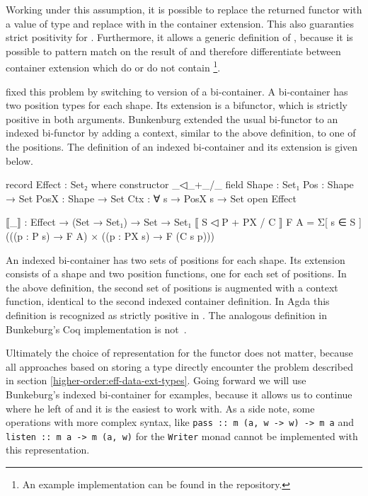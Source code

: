 Working under this assumption, it is possible to replace the returned functor
with a value of type \AgdaSpace{} and
replace  with  in the
container extension.
This also guaranties strict positivity for .
Furthermore, it allows a generic definition of \AgdaFunction{>>=}, because it is
possible to pattern match on the result of  and therefore
differentiate between container extension which do or do not contain
\footnote{An example implementation can be found in the
  repository.}.
 
\textcite{bunkenburg2019modeling} fixed this problem by switching to version of
a bi-container.
A bi-container has two position types for each shape.
Its extension is a bifunctor, which is strictly positive in both arguments.
Bunkenburg extended the usual bi-functor to an indexed bi-functor by adding a
context, similar to the above definition, to one of the positions.
The definition of an indexed bi-container and its extension is given below.

\begin{code}
record Effect : Set₂ where
  constructor _◁_+_/_
  field
    Shape : Set₁
    Pos : Shape → Set
    PosX : Shape → Set
    Ctx : ∀ s → PosX s → Set
open Effect

⟦_⟧ : Effect → (Set → Set₁) → Set → Set₁
⟦ S ◁ P + PX / C ⟧ F A = Σ[ s ∈ S ] (((p : P s) → F A) × ((p : PX s) → F (C s p)))
\end{code}
An indexed bi-container has two sets of positions for each shape.
Its extension consists of a shape and two position functions, one for each set
of positions.
In the above definition, the second set of positions is augmented with a context
function, identical to the second indexed container definition.
In Agda this definition is recognized as strictly positive in .
The analogous definition in Bunkeburg's Coq
implementation is not~\cite{bunkenburg2019modeling}.
 
Ultimately the choice of representation for the functor does not matter, because
all approaches based on storing a type directly encounter the problem described
in section \ref{higher-order:eff-data-ext-types}.
Going forward we will use Bunkeburg's indexed bi-container for examples, because
it allows us to continue where he left of and it is the easiest to work with.
As a side note, some operations with more complex syntax, like \texttt{pass :: m
(a, w -> w) -> m a} and \texttt{listen :: m a -> m (a, w)} for the
\texttt{Writer} monad cannot be implemented with this representation.
 

